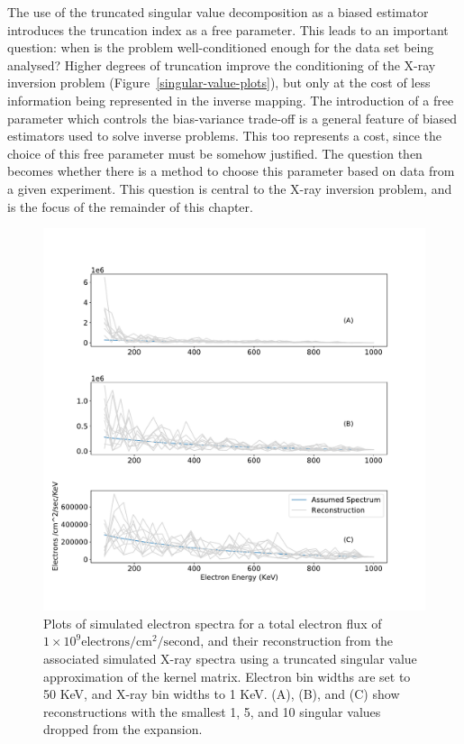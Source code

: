 The use of the truncated singular value decomposition as a biased estimator introduces the truncation index as a free parameter. This leads to an important question: when is the problem well-conditioned enough for the data set being analysed? Higher degrees of truncation improve the conditioning of the X-ray inversion problem (Figure~\ref{singular-value-plots}), but only at the cost of less information being represented in the inverse mapping. The introduction of a free parameter which controls the bias-variance trade-off is a general feature of biased estimators used to solve inverse problems. This too represents a cost, since the choice of this free parameter must be somehow justified. The question then becomes whether there is a method to choose this parameter based on data from a given experiment. This question is central to the X-ray inversion problem, and is the focus of the remainder of this chapter. 

\begin{figure}[p]
    \centering
    \includegraphics[width=.95\textwidth]{figures/chapter_4/tsvd_test/fig.pdf}
    \caption{Plots of simulated electron spectra for a total electron flux of $1\times10^9 \mbox{electrons} / \mbox{cm}^2 / \mbox{second}$, and their reconstruction from the associated simulated X-ray spectra using a truncated singular value approximation of the kernel matrix. Electron bin widths are set to 50 KeV, and X-ray bin widths to 1 KeV. (A), (B), and (C) show reconstructions with the smallest 1, 5, and 10 singular values dropped from the expansion.}
    \label{tsvd_test}
\end{figure}

